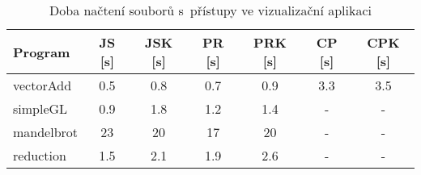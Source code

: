 \begin{table}
	\centering
	\caption{Doba načtení souborů s~přístupy ve vizualizační aplikaci}
	\label{tab:visloadtime}
	\bgroup
	\def\arraystretch{1.2}
	\begin{minipage}{\textwidth}
		\begin{tabularx}{\textwidth}{@{}|Y|c|c|c|c|c|c|}
			\hline
			\textbf{Program} & \textbf{JS [s]} & \textbf{JSK [s]} & \textbf{PR [s]} & \textbf{PRK [s]} & \textbf{CP [s]} & \textbf{CPK [s]} \\
			\hline
			vectorAdd & 0.5 & 0.8 & 0.7 & 0.9 & 3.3 & 3.5 \\
			\hline
			simpleGL & 0.9 & 1.8 & 1.2 & 1.4 & - & - \\
			\hline
			mandelbrot & 23 & 20 & 17 & 20 & - & - \\
			\hline
			reduction & 1.5 & 2.1 & 1.9 & 2.6 & - & - \\
			\hline
		\end{tabularx}
	\end{minipage}
	\egroup
\end{table}
